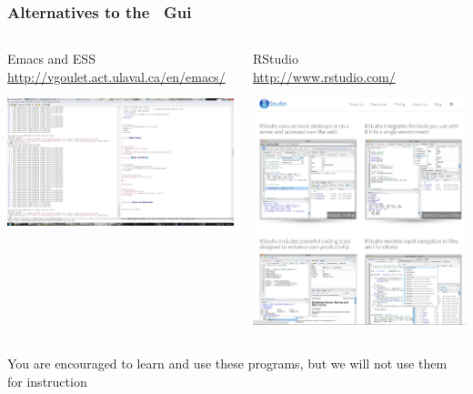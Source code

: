 \documentclass[color=usenames,dvipsnames]{beamer}\usepackage[]{graphicx}\usepackage[]{color}
\begin{document}
\begin{frame}
  \frametitle{Alternatives to the \R~Gui}
  \begin{columns}
    \small
    \begin{column}{0.6\textwidth}
      \centering
      Emacs and ESS \\ \tiny
      \url{http://vgoulet.act.ulaval.ca/en/emacs/} \par
      \includegraphics[width=\textwidth]{figs/emacs}
    \end{column}
    \begin{column}{0.4\textwidth}
      \centering
      RStudio \\
      \url{http://www.rstudio.com/} \par
      \includegraphics[width=\textwidth]{figs/Rstudio}
    \end{column}
  \end{columns}
  \small
  \vspace{0.5cm}
  You are encouraged to learn and use these programs, but we will not use them for instruction
\end{frame}
\end{document}
